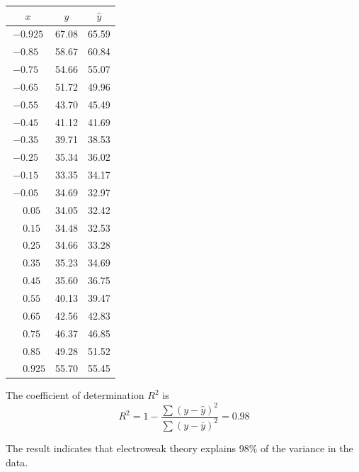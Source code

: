 \begin{center}
\begin{tabular}{|c|c|c|}
\hline
$x$ & $y$ & $\hat{y}$ \\
\hline
$-0.925$ & 67.08 & 65.59\\
$-0.85\phantom{0}$ & 58.67 & 60.84\\
$-0.75\phantom{0}$ & 54.66 & 55.07\\
$-0.65\phantom{0}$ & 51.72 & 49.96\\
$-0.55\phantom{0}$ & 43.70 & 45.49\\
$-0.45\phantom{0}$ & 41.12 & 41.69\\
$-0.35\phantom{0}$ & 39.71 & 38.53\\
$-0.25\phantom{0}$ & 35.34 & 36.02\\
$-0.15\phantom{0}$ & 33.35 & 34.17\\
$-0.05\phantom{0}$ & 34.69 & 32.97\\
$\phantom{+}0.05\phantom{0}$ & 34.05 & 32.42\\
$\phantom{+}0.15\phantom{0}$ & 34.48 & 32.53\\
$\phantom{+}0.25\phantom{0}$ & 34.66 & 33.28\\
$\phantom{+}0.35\phantom{0}$ & 35.23 & 34.69\\
$\phantom{+}0.45\phantom{0}$ & 35.60 & 36.75\\
$\phantom{+}0.55\phantom{0}$ & 40.13 & 39.47\\
$\phantom{+}0.65\phantom{0}$ & 42.56 & 42.83\\
$\phantom{+}0.75\phantom{0}$ & 46.37 & 46.85\\
$\phantom{+}0.85\phantom{0}$ & 49.28 & 51.52\\
$\phantom{+}0.925$ & 55.70 & 55.45\\
\hline
\end{tabular}
\end{center}

The coefficient of determination $R^2$ is
\begin{equation*}
R^2=1-\frac{\sum(y-\hat{y})^2}{\sum(y-\bar{y})^2}=0.98
\end{equation*}

The result indicates that electroweak theory explains 98\% of the variance in the data.

\fi


